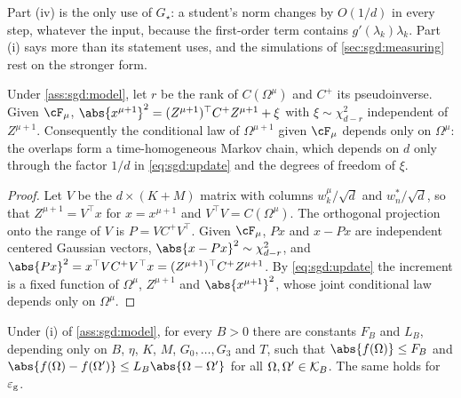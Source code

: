 \begin{refsection}
Part (iv) is the only use of $G_\star$: a student's norm changes by $O(1/d)$ in every step, whatever the input, because the first-order term contains $g'(\lambda_k)\lambda_k$. Part (i) says more than its statement uses, and the simulations of \cref{sec:sgd:measuring} rest on the stronger form.

\begin{lemma}\label{lem:sgd:markov}
Under \cref{ass:sgd:model}, let $r$ be the rank of $C(\Omega^\mu)$ and $C^+$ its pseudoinverse. Given $\cF_\mu$, $\abs{x^{\mu+1}}^2=(Z^{\mu+1})^\top C^+Z^{\mu+1}+\xi$ with $\xi\sim\chi^2_{d-r}$ independent of $Z^{\mu+1}$. Consequently the conditional law of $\Omega^{\mu+1}$ given $\cF_\mu$ depends only on $\Omega^\mu$: the overlaps form a time-homogeneous Markov chain, which depends on $d$ only through the factor $1/d$ in \eqref{eq:sgd:update} and the degrees of freedom of $\xi$.
\end{lemma}

\begin{proof}
Let $V$ be the $d\times(K+M)$ matrix with columns $w_k^\mu/\sqrt d$ and $w^*_n/\sqrt d$, so that $Z^{\mu+1}=V^\top x$ for $x=x^{\mu+1}$ and $V^\top V=C(\Omega^\mu)$. The orthogonal projection onto the range of $V$ is $P=VC^+V^\top$. Given $\cF_\mu$, $Px$ and $x-Px$ are independent centered Gaussian vectors, $\abs{x-Px}^2\sim\chi^2_{d-r}$, and $\abs{Px}^2=x^\top VC^+V^\top x=(Z^{\mu+1})^\top C^+Z^{\mu+1}$. By \eqref{eq:sgd:update} the increment is a fixed function of $\Omega^\mu$, $Z^{\mu+1}$ and $\abs{x^{\mu+1}}^2$, whose joint conditional law depends only on $\Omega^\mu$.
\end{proof}

\begin{lemma}\label{lem:sgd:lipschitz}
Under (i) of \cref{ass:sgd:model}, for every $B>0$ there are constants $F_B$ and $L_B$, depending only on $B$, $\eta$, $K$, $M$, $G_0,\dots,G_3$ and $T$, such that $\abs{f(\Omega)}\le F_B$ and $\abs{f(\Omega)-f(\Omega')}\le L_B\abs{\Omega-\Omega'}$ for all $\Omega,\Omega'\in\mathcal K_B$. The same holds for $\varepsilon_{\mathrm g}$.
\end{lemma}


\end{refsection}
